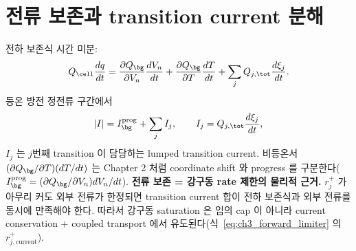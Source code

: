 \section{전류 보존과 transition current 분해}\label{sec:ch3_current}
전하 보존식 시간 미분:
\begin{equation}
Q_\cell\frac{dq}{dt}=\frac{\partial Q_\bg}{\partial V_n}\frac{dV_n}{dt}+\frac{\partial Q_\bg}{\partial T}\frac{dT}{dt}+\sum_j Q_{j,\tot}\frac{d\xi_j}{dt}.
\label{eq:ch3_current_balance}
\end{equation}
등온 방전 정전류 구간에서
\begin{equation}
|I|=I_\bg^{\mathrm{prog}}+\sum_j I_j,\qquad I_j=Q_{j,\tot}\frac{d\xi_j}{dt},
\label{eq:ch3_current_decomp}
\end{equation}
$I_j$ 는 $j$번째 transition 이 담당하는 lumped transition current. 비등온서 $(\partial Q_\bg/\partial T)(dT/dt)$ 는
Chapter 2 처럼 coordinate shift 와 progress 를 구분한다($I_\bg^{\mathrm{prog}}=(\partial Q_\bg/\partial V_n)dV_n/dt$).
\textbf{전류 보존 = 강구동 rate 제한의 물리적 근거.} $r_j^+$ 가 아무리 커도 외부 전류가 한정되면 transition
current 합이 전하 보존식과 외부 전류를 동시에 만족해야 한다. 따라서 강구동 saturation 은 임의 cap 이 아니라
current conservation + coupled transport 에서 유도된다(식~\eqref{eq:ch3_forward_limiter} 의
$r_{j,\mathrm{current}}^+$).

